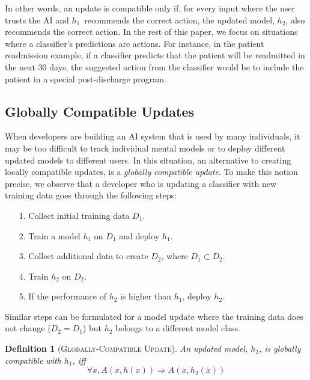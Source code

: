 \documentclass[letterpaper]{article} %
\newcommand{\?}{\mbox{?}}
\newcommand{\hone}{\mbox{$h_1$}}
\newcommand{\htwo}{\mbox{$h_2$}}
\newcommand{\dtrainone}{\mbox{$D_1$}}
\newcommand{\dtraintwo}{\mbox{$D_2$}}
\newtheorem*{definition}{Definition}
\begin{document}
In other words, an update is compatible only if, for every input where the user trusts the AI and \hone\ recommends the correct action, the updated model, \htwo, also recommends the correct action. In the rest of this paper, we focus on situations where a classifier's predictions are actions. For instance, in the patient readmission example, if a classifier predicts that the patient will be readmitted in the next 30 days, the suggested action from the classifier would be to include the patient in a special post-discharge program.

\subsection{Globally Compatible Updates}

When developers are building an AI system that is used by many individuals, it may be too difficult to track individual mental models or to deploy different updated models to different users. In this situation, an alternative to creating locally compatible updates, is a {\em globally compatible update}. To make this notion precise, we observe that a developer who is updating a classifier with new training data goes through the following steps: 

\begin{itemize}
\setlength\itemsep{.1em}
    \item[1.] Collect initial training data $\dtrainone$.
    \item[2.] Train a model $\hone$ on $\dtrainone$ and deploy $\hone$.
    \item[3.] Collect additional data to create $\dtraintwo$, where $\dtrainone \subset \dtraintwo$.
    \item[4.] Train $\htwo$ on $\dtraintwo$.
    \item[5.] If the performance of $\htwo$ is higher than $\hone$, deploy $\htwo$.
\end{itemize}
Similar steps can be formulated for a model update where the training data does not change ($\dtraintwo=\dtrainone$) but $\htwo$ belongs to a different model class. 
\begin{definition}[\textsc{Globally-Compatible Update}]
An updated model, \htwo,  is globally compatible with \hone, iff
\[\forall x, A(x, h(x))\Rightarrow A(x, \htwo(x)) \]
\end{definition}
\end{document}
